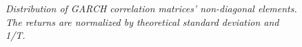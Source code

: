 \documentclass{article}
\begin{document}
\begin{figure}[htb!]
  \centering
  \caption{\small \it Distribution of GARCH correlation matrices'
    non-diagonal elements. The returns are normalized by theoretical standard
    deviation and 1/T.}
  \label{fig:garch_Cij_theo}
\end{figure}
\end{document}

